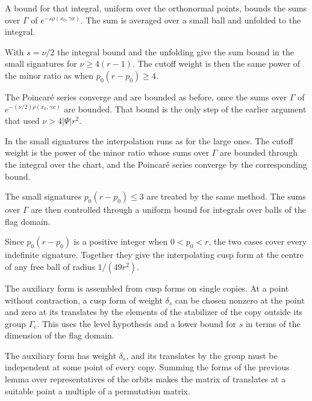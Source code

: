 A bound for that integral, uniform over the orthonormal points, bounds the sums over $\Gamma$ of
$e^{-s\rho(x_0,\gamma x)}$. The sum is averaged over a small ball and unfolded to the integral.

With $s=\nu/2$ the integral bound and the unfolding give the sum bound in the small signatures for
$\nu\geq4(r-1)$. The cutoff weight is then the same power of the minor ratio as when $p_0(r-p_0)\geq4$.

The Poincaré series converge and are bounded as before, once the sums over $\Gamma$ of
$e^{-(\nu/2)\rho(x_0,\gamma x)}$ are bounded. That bound is the only step of the earlier argument that used
$\nu>4|\Psi|r^2$.

In the small signatures the interpolation runs as for the large ones. The cutoff weight is the power of the
minor ratio whose sums over $\Gamma$ are bounded through the integral over the chart, and the Poincaré series
converge by the corresponding bound.

The small signatures $p_0(r-p_0)\le3$ are treated by the same method. The sums over $\Gamma$ are then
controlled through a uniform bound for integrals over balls of the flag domain.

Since $p_0(r-p_0)$ is a positive integer when $0<p_0<r$, the two cases cover every indefinite signature.
Together they give the interpolating cusp form at the centre of any free ball of radius $1/(49r^2)$.

The auxiliary form is assembled from cusp forms on single copies. At a point without contraction, a
cusp form of weight $\delta_s$ can be chosen nonzero at the point and zero at its translates by the
elements of the stabilizer of the copy outside its group $\Gamma_c$. This uses the level hypothesis and a
lower bound for $s$ in terms of the dimension of the flag domain.

The auxiliary form has weight $\delta_s$, and its translates by the group must be independent at some
point of every copy. Summing the forms of the previous lemma over representatives of the orbits makes
the matrix of translates at a suitable point a multiple of a permutation matrix.


